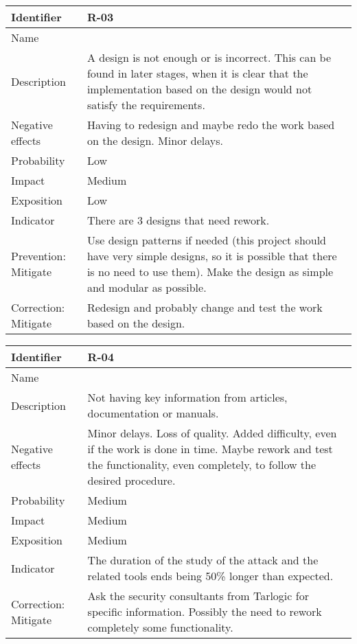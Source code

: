 \begin{table}[H]
	\begin{tabularx}{\textwidth}{|y|z|}
		\hline
		Identifier & \textbf{R-03} \\ \hline
		Name & \Rtres \\ \hline
		Description &
			A design is not enough or is incorrect. \linej
			This can be found in later stages, when it is clear that the implementation based on the design would not satisfy the requirements.
		\\ \hline
		Negative effects &
			Having to redesign and maybe redo the work based on the design. \linej
			Minor delays.
		\\ \hline
		Probability & Low\\ \hline
		Impact &  Medium\\ \hline
		Exposition & Low\\ \hline
		Indicator & There are 3 designs that need rework.\\ \hline
		Prevention: Mitigate &
			Use design patterns if needed (this project should have very simple designs, so it is possible that there is no need to use them). \linej
			Make the design as simple and modular as possible.
		\\ \hline
		Correction: Mitigate &
			Redesign and probably change and test the work based on the design.
		\\ \hline
	\end{tabularx}
\end{table}

\begin{table}[H]
	\begin{tabularx}{\textwidth}{|y|z|}
		\hline
		Identifier & \textbf{R-04} \\ \hline
		Name & \Rcuatro \\ \hline
		Description &
			Not having key information from articles, documentation or manuals.
		\\ \hline
		Negative effects &
			Minor delays. \linej
			Loss of quality. \linej
			Added difficulty, even if the work is done in time. \linej
			Maybe rework and test the functionality, even completely, to follow the desired procedure.
		\\ \hline
		Probability & Medium\\ \hline
		Impact &  Medium\\ \hline
		Exposition &  Medium\\ \hline
		Indicator & The duration of the study of the attack and the related tools ends being 50\% longer than expected. \\ \hline
		Correction: Mitigate &
			Ask the security consultants from Tarlogic for specific information. \linej
			Possibly the need to rework completely some functionality.
		\\ \hline
	\end{tabularx}
\end{table}

